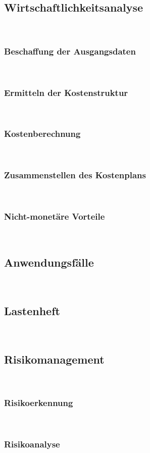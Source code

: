 \documentclass[11pt,toc=sectionentrywithoutdots, headheight=44pt, headings=optiontoheadandtoc]{scrartcl}
\begin{document}
\subsection{Wirtschaftlichkeitsanalyse}
\blindtext\

\subsubsection{Beschaffung der Ausgangsdaten}
\blindtext\

\subsubsection{Ermitteln der Kostenstruktur}
\blindtext\

\subsubsection{Kostenberechnung}
\blindtext\

\subsubsection{Zusammenstellen des Kostenplans}
\blindtext\

\subsubsection{Nicht-monetäre Vorteile}
\blindtext\

\subsection{Anwendungsfälle}
\blindtext\

\subsection{Lastenheft}
\blindtext\

\subsection{Risikomanagement}
\blindtext\

\subsubsection{Risikoerkennung}
\blindtext\

\subsubsection{Risikoanalyse}
\blindtext\
\end{document}
